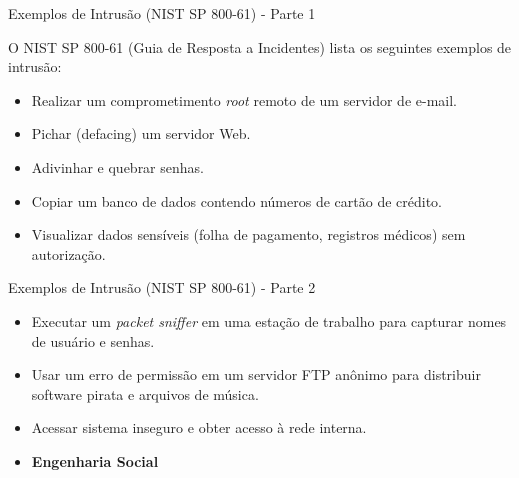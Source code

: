 \begin{frame}{Exemplos de Intrusão (NIST SP 800-61) - Parte 1}

    O NIST SP 800-61 (Guia de Resposta a Incidentes) lista os seguintes exemplos de intrusão:
    \begin{itemize}

        \item Realizar um comprometimento \textit{root} remoto de um servidor de e-mail.

        \item Pichar (defacing) um servidor Web.

        \item Adivinhar e quebrar senhas.

        \item Copiar um banco de dados contendo números de cartão de crédito.

        \item Visualizar dados sensíveis (folha de pagamento, registros médicos) sem autorização.
    \end{itemize}
\end{frame}

\begin{frame}{Exemplos de Intrusão (NIST SP 800-61) - Parte 2}
    \begin{itemize}
        \item Executar um \textit{packet sniffer} em uma estação de trabalho para capturar nomes de usuário e senhas.

        \item Usar um erro de permissão em um servidor FTP anônimo para distribuir software pirata e arquivos de música.

        \item Acessar sistema inseguro e obter acesso à rede interna.

        \item \textbf{Engenharia Social}

    \end{itemize}
\end{frame}

